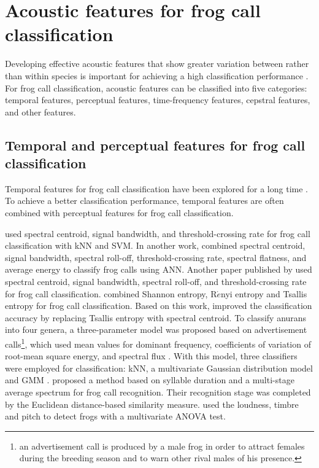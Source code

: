 \section{Acoustic features for frog call classification}
\label{features}
Developing effective acoustic features that show greater variation between rather than within species is important for achieving a high classification performance \citep{Fox20081187}. For frog call classification, acoustic features can be classified into five categories: temporal features, perceptual features, time-frequency features, cepstral features, and other features. 

\subsection{Temporal and perceptual features for frog call classification}

Temporal features for frog call classification have been explored for a long time \citep{huang2008realization, huang2009frog, dayou2011classification, chen2012automatic, camacho2013automatic, Huang20141}. To achieve a better classification performance, temporal features are often combined with perceptual features for frog call classification.
 
\cite{huang2009frog} used spectral centroid, signal bandwidth, and threshold-crossing rate for frog call classification with kNN and SVM. In another work, \cite{Huang20141} combined spectral centroid, signal bandwidth, spectral roll-off, threshold-crossing rate, spectral flatness, and average energy to classify frog calls using ANN. Another paper published by  \citep{huang2008realization} used spectral centroid, signal bandwidth, spectral roll-off, and threshold-crossing rate for frog call classification. 
\cite{dayou2011classification} combined Shannon entropy, R$\acute{e}$nyi entropy and Tsallis entropy for frog call classification. Based on this work, \cite{han2011acoustic} improved the classification accuracy by replacing Tsallis entropy with spectral centroid.
To classify anurans into four genera, a three-parameter model was proposed based on advertisement calls\footnote[1]{an advertisement call is produced by a male frog in order to attract females during the breeding season and to warn other rival males of his presence.}, which used mean values for dominant frequency, coefficients of variation of root-mean square energy, and spectral flux \citep{Gingras2013}. With this model, three classifiers  were employed for classification: kNN, a multivariate Gaussian distribution model and GMM \citep{Gingras2013}.
\cite{chen2012automatic} proposed a method based on syllable duration and a multi-stage average spectrum for frog call recognition. Their recognition stage was completed by the Euclidean distance-based similarity measure. \cite{camacho2013automatic} used the loudness, timbre and pitch to detect frogs with a multivariate ANOVA test.







